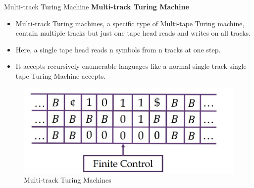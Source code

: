 \documentclass{beamer}
\begin{document}
\begin{frame}{Multi-track Turing Machine}
	\textbf{Multi-track Turing Machine}
	\begin{itemize}
		\item Multi-track Turing machines, a specific type of Multi-tape Turing machine, contain
		multiple tracks but just one tape head reads and writes on all tracks. \item Here, a single
		tape head reads n symbols from n tracks at one step. 
		\item It accepts recursively
		enumerable languages like a normal single-track single-tape Turing Machine accepts.
	\end{itemize}
\begin{figure}
	\includegraphics[scale=.4]{img5/m16}
	\caption{Multi-track Turing Machines}
\end{figure}
\end{frame}
\end{document}
